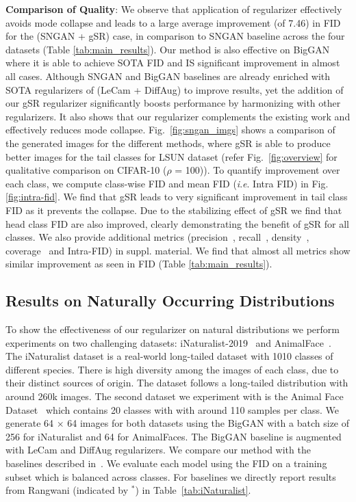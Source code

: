 \documentclass[runningheads,table]{llncs}
\newcommand{\ie}{\textit{i}.\textit{e}. }
\begin{document}
\noindent\textbf{Comparison of Quality}: We observe that application of regularizer effectively avoids mode collapse and leads to a large average improvement (of 7.46) in FID for the (SNGAN + gSR) case, in comparison to SNGAN baseline across the four datasets (Table \ref{tab:main_results}). Our method is also effective on BigGAN where it is able to achieve SOTA FID and IS significant improvement in almost all cases. Although SNGAN and BigGAN baselines are already enriched with SOTA regularizers of (LeCam + DiffAug) to improve results, yet the addition of our gSR regularizer significantly boosts performance by harmonizing with other regularizers. It also shows that our regularizer complements the existing work and effectively reduces mode collapse. Fig.~\ref{fig:sngan_imgs} shows a comparison of the generated images for the different methods, where gSR is able to produce better images for the tail classes for LSUN dataset (refer Fig.~\ref{fig:overview} for qualitative comparison on CIFAR-10 ($\rho$ = 100)). To quantify improvement over each class, we compute class-wise FID and mean FID (\ie Intra FID) in Fig. \ref{fig:intra-fid}. We find that gSR leads to very significant improvement in tail class FID as it prevents the collapse. Due to the stabilizing effect of gSR we find that head class FID are also improved, clearly demonstrating the benefit of gSR for all classes. We also provide additional metrics (precision~\cite{kynkaanniemi2019improved}, recall~\cite{kynkaanniemi2019improved}, density~\cite{ferjad2020icml}, coverage~\cite{ferjad2020icml} and Intra-FID) in suppl. material. We find that almost all metrics show similar improvement as seen in FID (Table \ref{tab:main_results}). 






\subsection{Results on Naturally Occurring Distributions}
\label{sec:natural_dist_results}
To show the effectiveness of our regularizer on natural distributions we perform experiments on two challenging datasets: iNaturalist-2019~\cite{inat19} and AnimalFace~\cite{si2011learning}. The iNaturalist dataset is a real-world long-tailed dataset with 1010 
classes of different species. There is high diversity among the images of each class, due to their distinct sources of origin. The dataset follows a long-tailed distribution with around 260k images. The second dataset we experiment with is the Animal Face Dataset~\cite{kolouri2016sliced} which contains 20 classes with with around 110 samples per class. We generate 64 $\times$ 64 images for both datasets using the BigGAN with a batch size of 256 for iNaturalist and 64 for AnimalFaces. The BigGAN baseline is augmented with LeCam and DiffAug regularizers. We compare our method with the baselines described in~\cite{rangwani2021class}. We evaluate each model using the FID on a training subset which is balanced across classes. For baselines we directly report results from Rangwani \etal \cite{rangwani2021class} (indicated by $^*$) in 
Table~\ref{tab:iNaturalist}.
\end{document}
